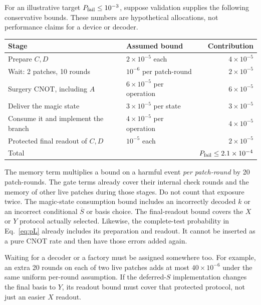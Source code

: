 \documentclass[11pt,a4paper]{article}
\begin{document}
For an illustrative target $P_{\rm fail}\leq10^{-3}$, suppose validation supplies the following conservative bounds. These numbers are hypothetical allocations, not performance claims for a device or decoder.
\begin{center}
\begin{tabularx}{\linewidth}{@{}Xlr@{}}
\toprule
Stage & Assumed bound & Contribution\\
\midrule
Prepare $C,D$ & $2\times10^{-5}$ each & $4\times10^{-5}$\\
Wait: 2 patches, 10 rounds & $10^{-6}$ per patch-round & $2\times10^{-5}$\\
Surgery CNOT, including $A$ & $6\times10^{-5}$ per operation & $6\times10^{-5}$\\
Deliver the magic state & $3\times10^{-5}$ per state & $3\times10^{-5}$\\
Consume it and implement the branch & $4\times10^{-5}$ per operation & $4\times10^{-5}$\\
Protected final readout of $C,D$ & $10^{-5}$ each & $2\times10^{-5}$\\
\midrule
Total & & $P_{\rm fail}\leq2.1\times10^{-4}$\\
\bottomrule
\end{tabularx}
\label{tab:budget}
\end{center}

The memory term multiplies a bound on a harmful event \emph{per patch-round} by 20 patch-rounds. The gate terms already cover their internal check rounds and the memory of other live patches during those stages. Do not count that exposure twice. The magic-state consumption bound includes an incorrectly decoded $k$ or an incorrect conditional $\overline S$ or basis choice. The final-readout bound covers the $X$ or $Y$ protocol actually selected. Likewise, the complete-test probability in Eq.~\eqref{eq:pL} already includes its preparation and readout. It cannot be inserted as a pure CNOT rate and then have those errors added again.

Waiting for a decoder or a factory must be assigned somewhere too. For example, an extra 20 rounds on each of two live patches adds at most $40\times10^{-6}$ under the same uniform per-round assumption. If the deferred-$S$ implementation changes the final basis to $Y$, its readout bound must cover that protected protocol, not just an easier $X$ readout.
\end{document}
